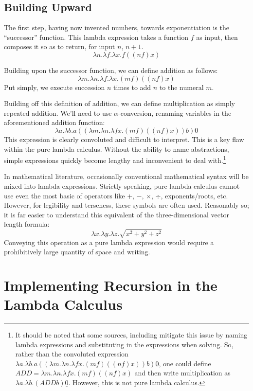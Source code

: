 \documentclass[twocolumn,titlepage,12pt]{article}
\begin{document}
\subsection{Building Upward}
The first step, having now invented numbers, towards exponentiation is the ``successor'' function. This lambda expression takes a function $f$ as input, then composes it so as to return, for input $n$, $n+1$.
$$\lambda n.\lambda f.\lambda x.f((n f) x)$$

Building upon the successor function, we can define addition as follows:
$$\lambda m.\lambda n.\lambda f.\lambda x.(m f) ((n f) x)$$
Put simply, we execute succession $n$ times to add $n$ to the numeral $m$.

Building off this definition of addition, we can define multiplication as simply repeated addition. We'll need to use $\alpha$-conversion, renaming variables in the aforementioned addition function:
$$\lambda a.\lambda b.a ((\lambda m.\lambda n.\lambda fx.(m f) ((n f) x)) b) \underline{0}$$
This expression is clearly convoluted and difficult to interpret. This is a key flaw within the pure lambda calculus. Without the ability to name abstractions, simple expressions quickly become lengthy and inconvenient to deal with.\footnote{It should be noted that some sources, including \cite{cornelllc}\cite{rojastutorial} mitigate this issue by naming lambda expressions and substituting in the expressions when solving. So, rather than the convoluted expression $\lambda a.\lambda b.a ((\lambda m.\lambda n.\lambda fx.(m f) ((n f) x)) b) \underline{0}$, one could define $ADD=\lambda m.\lambda n.\lambda fx.(m f) ((n f) x)$ and then write multiplication as $\lambda a.\lambda b.(ADD b) \underline{0}$. However, this is not pure lambda calculus.}

In mathematical literature, occasionally conventional mathematical syntax will be mixed into lambda expressions. Strictly speaking, pure lambda calculus cannot use even the most basic of operators like $+$, $-$, $\times$, $\div$, exponents/roots, etc. However, for legibility and terseness, these symbols are often used. Reasonably so; it is far easier to understand this equivalent of the three-dimensional vector length formula:
$$\lambda x.\lambda y.\lambda z.\sqrt{x^2+y^2+z^2}$$
Conveying this operation as a pure lambda expression would require a prohibitively large quantity of space and writing.

\section{Implementing Recursion in the Lambda Calculus}
\end{document}

